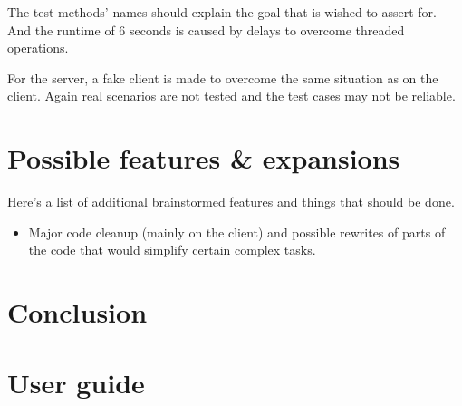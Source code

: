 \documentclass[12pt]{rapport}
\begin{document}
The test methods' names should explain the goal that is wished to
assert for. And the runtime of
{\selectfont\texttildelow}$6$ seconds is caused by
delays to overcome threaded operations.

For the server, a fake client is made to overcome the same situation
as on the client. Again real scenarios are not tested and the test
cases may not be reliable.

\section*{Possible features \& expansions}
Here's a list of additional brainstormed features and things that
should be done.
\begin{itemize}
\item Major code cleanup (mainly on the client) and possible
  rewrites of parts of the code that would simplify certain complex
  tasks.
\end{itemize}


\newpage
\section*{Conclusion}




\newpage
\section*{User guide}
\end{document}
